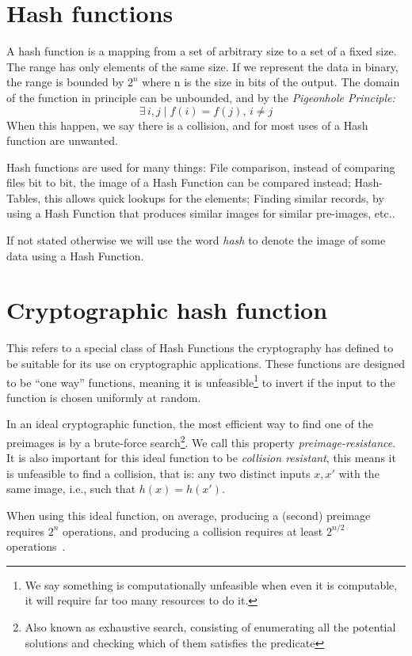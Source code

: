 \section{Hash functions}
A hash function is a mapping from a set of arbitrary size to a set of a fixed
  size.
The range has only elements of the same size.
If we represent the data in binary, the range is bounded by $2^n$ where n
  is the size in bits of the output.
The domain of the function in principle can be unbounded, and by the
  \textit{Pigeonhole Principle:}
\begin{equation}
    \mathit{\exists \, i, j \mid f(i) = f(j), \, i \neq j}
\end{equation}
When this happen, we say there is a collision, and for most uses of a Hash
  function are unwanted.

Hash functions are used for many things: File comparison, instead of comparing
  files bit to bit, the image of a Hash Function can be compared instead;
  Hash-Tables, this allows quick lookups for the elements; Finding similar
  records, by using a Hash Function that produces similar images for similar
  pre-images, etc..

If not stated otherwise we will use the word \textit{hash} to denote the image of
  some data using a Hash Function.

\section{Cryptographic hash function}
This refers to a special class of Hash Functions the cryptography has defined
  to be suitable for its use on cryptographic applications. These functions are
  designed to be ``one way'' functions, meaning it is unfeasible\footnote{We %
  say something is computationally unfeasible when even it is computable, it
  will require far too many resources to do it.} to invert if the input to the
  function is chosen uniformly at random.

In an ideal cryptographic function, the most efficient way to find one of the
  preimages is by a brute-force search\footnote{Also known as exhaustive search,
  consisting of enumerating all the potential solutions and checking which of
  them satisfies the predicate}. We call this property
  \textit{preimage-resistance}.
It is also important for this ideal function to be \textit{collision
  resistant}, this means it is unfeasible to find a collision, that is: any two
  distinct inputs $x, x'$ with the same image, i.e., such that $h(x) = h(x')$.

When using this ideal function, on average, producing a (second) preimage
  requires $2^n$ operations, and producing a collision requires at least
  $2^{n / 2}$ operations~\cite{preneel1993analysis}.
